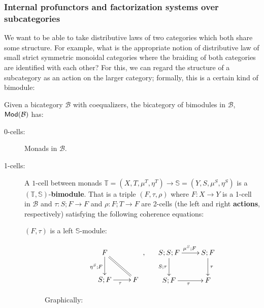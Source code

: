 \subsubsection{Internal profunctors and factorization systems over subcategories}

We want to be able to take distributive laws of two categories which both share some structure.  For example, what is the appropriate notion of distributive law of small strict symmetric monoidal categories where the braiding of both categories are identified with each other?  For this, we can regard the structure of a subcategory as an action on the larger category; formally, this is a certain kind of bimodule:



\begin{definition}
Given a bicategory $\mathcal B$ with coequalizers,
the bicategory of bimodules in $\mathcal B$, ${\sf Mod}(\mathcal{B})$ has:

\begin{description}
\item[0-cells:] Monads in $\mathcal B$.
\item[1-cells:] A $1$-cell between monads $\mathbb{T}=(X,T,\mu^T,\eta^T)\to \mathbb{S}=(Y,S,\mu^S,\eta^S)$ is a $(\mathbb{T},\mathbb{S})$-{\bf bimodule}.  That is a triple $(F,\tau,\rho)$ where  $F:X\to Y$ is a 1-cell in $\mathcal B$ and $\tau:S;F\to F$ and $\rho:F;T\to F$ are  2-cells (the left and right {\bf actions}, respectively) satisfying the following coherence equations: 

\begin{description}

\item[$(F,\tau)$ is a left $\mathbb{S}$-module:]
$$
\xymatrix{
  F \ar@{=}[dr] \ar[d]_{\eta^S;F} 
\\S;F \ar[r]_{\tau}
   & F
}\ ,
\hspace{.5cm}
\xymatrix{
 S;S;F \ar[r]^{\ \mu^S;F} \ar[d]_{S;\tau}
  & S;F \ar[d]^{\tau}
\\S;F \ar[r]_{\tau}
  &F
}
$$

Graphically:



\end{description}
\end{description}
\end{definition}
